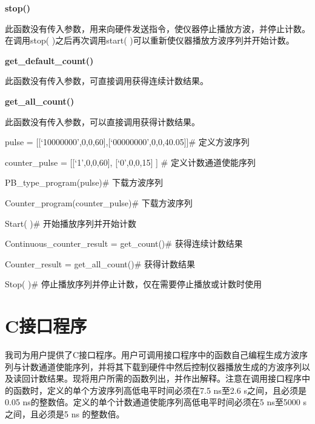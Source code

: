 \noindent\fontsize{12pt}{\baselineskip}\textbf{stop()}

此函数没有传入参数，用来向硬件发送指令，使仪器停止播放方波，并停止计数。在调用stop( )之后再次调用start( )可以重新使仪器播放方波序列并开始计数。
\vspace{0.4cm}

\noindent\fontsize{12pt}{\baselineskip}\textbf{get\_default\_count()}

此函数没有传入参数，可直接调用获得连续计数结果。
\vspace{0.4cm}

\noindent\fontsize{12pt}{\baselineskip}\textbf{get\_all\_count()}

此函数没有传入参数，可以直接调用获得计数结果。
\vspace{0.4cm}

\noindent\fontsize{12pt}{\baselineskip}\textbf{}

pulse = [[`10000000',0,0,60],[`00000000',0,0,40.05]]\qquad  \#  定义方波序列

counter\_pulse = [[`1',0,0,60], [`0',0,0,15] ]       \qquad  \#  定义计数通道使能序列

PB\_type\_program(pulse)\qquad            \#  下载方波序列

Counter\_program(counter\_pulse)\qquad     \#  下载方波序列

Start( )\qquad          \#  开始播放序列并开始计数

Continuous\_counter\_result = get\_count()\qquad    \#  获得连续计数结果

Counter\_result = get\_all\_count()\qquad           \#  获得计数结果

Stop( )\qquad     \#  停止播放序列并停止计数，仅在需要停止播放或计数时使用

\section{C\heiti 接口程序}
我司为用户提供了C接口程序。用户可调用接口程序中的函数自己编程生成方波序列与计数通道使能序列，并将其下载到硬件中然后控制仪器播放生成的方波序列以及读回计数结果。现将用户所需的函数列出，并作出解释。注意在调用接口程序中的函数时，定义的单个方波序列高低电平时间必须在7.5 ns至2.6 s之间，且必须是0.05 ns的整数倍。定义的单个计数通道使能序列高低电平时间必须在5 ns至5000 s之间，且必须是5 ns 的整数倍。

